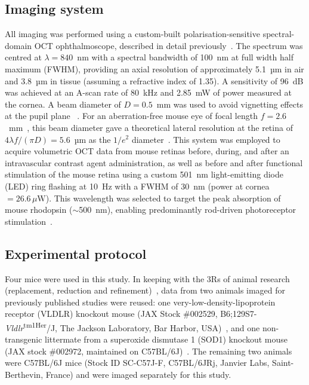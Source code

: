 \documentclass{optica-article}
\begin{document}
\subsection{Imaging system}
\label{subsec:imaging_system}
All imaging was performed using a custom-built polarisation-sensitive spectral-domain OCT ophthalmoscope, described in detail previously~\cite{fialovaPolarizationPropertiesSingle2016}. The spectrum was centred at $\lambda=840$~nm with a spectral bandwidth of 100~nm at full width half maximum (FWHM), providing an axial resolution of approximately 5.1~µm in air and 3.8~µm in tissue (assuming a refractive index of 1.35). A sensitivity of 96~dB was achieved at an A-scan rate of 80~kHz and 2.85~mW of power measured at the cornea. A beam diameter of $D = 0.5$~mm was used to avoid vignetting effects at the pupil plane ~\cite{merkleHighresolutionDepthresolvedVascular2021}. For an aberration-free mouse eye of focal length $f = 2.6$~mm~\cite{gengOpticalPropertiesMouse2011,schmuckerParaxialSchematicEye2004}, this beam diameter gave a theoretical lateral resolution at the retina of $4\lambda f/(\pi D) = 5.6$~µm as the $1/e^2$ diameter~\cite{harperRetinalAnalysisMouse2020}. This system was employed to acquire volumetric OCT data from mouse retinas before, during, and after an intravascular contrast agent administration, as well as before and after functional stimulation of the mouse retina using a custom 501~nm light-emitting diode (LED) ring flashing at 10~Hz with a  FWHM of 30~nm (power at cornea~$= 26.6\,\mu\mathrm{W}$). This wavelength was selected to target the peak absorption of mouse rhodopsin ($\sim$500~nm), enabling predominantly rod-driven photoreceptor stimulation~\cite{fuPhototransductionMouseRods2007}.

\subsection{Experimental protocol}
\label{subsec:experimental_protocol}
Four mice were used in this study. In keeping with the 3Rs of animal research (replacement, reduction and refinement)~\cite{olssonProtectingAnimalsEnabling2016}, data from two animals imaged for previously published studies were reused: one very-low-density-lipoprotein receptor (VLDLR) knockout mouse (JAX Stock \#002529, B6;129S7-\textit{Vldlr}\textsuperscript{tm1Her}/J, The Jackson Laboratory, Bar Harbor, USA)~\cite{merkleHighresolutionDepthresolvedVascular2021}, and one non-transgenic littermate from a superoxide dismutase 1 (SOD1) knockout mouse (JAX stock \#002972, maintained on C57BL/6J)~\cite{augustinOpticalCoherenceTomography2020}. The remaining two animals were C57BL/6J mice (Stock ID SC-C57J-F, C57BL/6JRj, Janvier Labs, Saint-Berthevin, France) and were imaged separately for this study.
\end{document}
